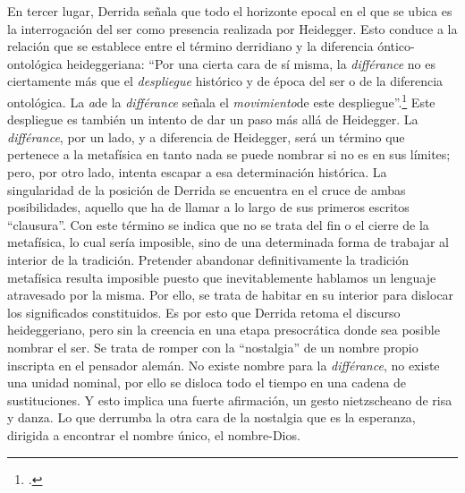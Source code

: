 En tercer lugar, Derrida señala que todo el horizonte epocal en el que
se ubica es la interrogación del ser como presencia realizada por
Heidegger. Esto conduce a la relación que se establece entre el término
derridiano y la diferencia óntico-ontológica heideggeriana: \enquote{Por una
cierta cara de sí misma, la \emph{différance} no es ciertamente más que
el \emph{despliegue} histórico y de época del ser o de la diferencia
ontológica. La \emph{a}de la \emph{différance} señala el
\emph{movimiento}de este despliegue}.\footcites[23]{derrida1989a}[La
  diferencia ontológica sería, así, derivada: \enquote{(\dots) ente y ser,
  óntico y ontológico, \enquote{óntico-ontológico} serían, en
  un~estilo\emph{~}original,~\emph{derivados~}respecto de la diferencia;
  y en relación con lo que. más adelante denominaremos
  la~\emph{différance}, concepto económico que designa la producción del
  diferir, en el doble sentido de esta palabra La diferencia
  óntico-ontológica y su fundamento (\emph{Grund}) en la ``trascendencia
  del Dasein''{[}\emph{Vom Wesen des Grundes}, p. 16{]}\emph{~}no serían
  absolutamente originarios. La différance sería más ``originaria'',
  pero no podría denominársela ya ``origen'' ni ``fundamento'', puesto
  que estas nociones pertenecen esencialmente a la historia de la
  onto-teología, es decir al sistema que funciona como borradura de la
  diferencia}.][32]{derrida1989a} Este despliegue es también un intento de dar
un paso más allá de Heidegger. La \emph{différance}, por un lado, y a
diferencia de Heidegger, será un término que pertenece a la metafísica
en tanto nada se puede nombrar si no es en sus límites; pero, por otro
lado, intenta escapar a esa determinación histórica. La singularidad de
la posición de Derrida se encuentra en el cruce de ambas posibilidades,
aquello que ha de llamar a lo largo de sus primeros escritos \enquote{clausura}.
Con este término se indica que no se trata del fin o el cierre de la
metafísica, lo cual sería imposible, sino de una determinada forma de
trabajar al interior de la tradición. Pretender abandonar
definitivamente la tradición metafísica resulta imposible puesto que
inevitablemente hablamos un lenguaje atravesado por la misma. Por ello,
se trata de habitar en su interior para dislocar los significados
constituidos. Es por esto que Derrida retoma el discurso heideggeriano,
pero sin la creencia en una etapa presocrática donde sea posible nombrar
el ser. Se trata de romper con la \enquote{nostalgia} de un nombre propio
inscripta en el pensador alemán. No existe nombre para la
\emph{différance}, no existe una unidad nominal, por ello se disloca
todo el tiempo en una cadena de sustituciones. Y esto implica una fuerte
afirmación, un gesto nietzscheano de risa y danza. Lo que derrumba la
otra cara de la nostalgia que es la esperanza, dirigida a encontrar el
nombre único, el nombre-Dios.

